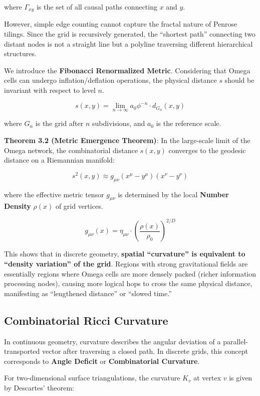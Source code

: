 where $\Gamma_{xy}$ is the set of all causal paths connecting $x$ and $y$.

However, simple edge counting cannot capture the fractal nature of Penrose tilings. Since the grid is recursively generated, the ``shortest path'' connecting two distant nodes is not a straight line but a polyline traversing different hierarchical structures.

We introduce the \textbf{Fibonacci Renormalized Metric}. Considering that Omega cells can undergo inflation/deflation operations, the physical distance $s$ should be invariant with respect to level $n$.

\[s(x, y) = \lim_{n \to \infty} a_0 \phi^{-n} \cdot d_{G_n}(x, y)\]

where $G_n$ is the grid after $n$ subdivisions, and $a_0$ is the reference scale.

\textbf{Theorem 3.2 (Metric Emergence Theorem)}:
In the large-scale limit of the Omega network, the combinatorial distance $s(x,y)$ converges to the geodesic distance on a Riemannian manifold:

\[s^2(x, y) \approx g_{\mu\nu} (x^\mu - y^\mu) (x^\nu - y^\nu)\]

where the effective metric tensor $g_{\mu\nu}$ is determined by the local \textbf{Number Density} $\rho(x)$ of grid vertices.

\[g_{\mu\nu}(x) = \eta_{\mu\nu} \cdot \left( \frac{\rho(x)}{\rho_0} \right)^{2/D}\]

This shows that in discrete geometry, \textbf{spatial ``curvature'' is equivalent to ``density variation'' of the grid}. Regions with strong gravitational fields are essentially regions where Omega cells are more densely packed (richer information processing nodes), causing more logical hops to cross the same physical distance, manifesting as ``lengthened distance'' or ``slowed time.''

\subsection{Combinatorial Ricci Curvature}

In continuous geometry, curvature describes the angular deviation of a parallel-transported vector after traversing a closed path. In discrete grids, this concept corresponds to \textbf{Angle Deficit} or \textbf{Combinatorial Curvature}.

For two-dimensional surface triangulations, the curvature $K_v$ at vertex $v$ is given by Descartes' theorem:

